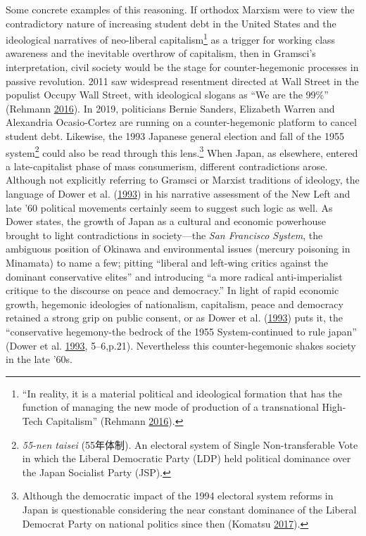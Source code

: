 \documentclass[10pt,british,A4paper,,openany]{memoir}
\begin{document}
Some concrete examples of this reasoning. If orthodox Marxism were to
view the contradictory nature of increasing student debt in the United
States and the ideological narratives of neo-liberal
capitalism\footnote{``In reality, it is a material political and
  ideological formation that has the function of managing the new mode
  of production of a transnational High-Tech Capitalism'' (Rehmann
  \protect\hyperlink{ref-rehmann_bernie_2016}{2016}).} as a trigger for
working class awareness and the inevitable overthrow of capitalism, then
in Gramsci's interpretation, civil society would be the stage for
counter-hegemonic processes in passive revolution. 2011 saw widespread
resentment directed at Wall Street in the populist Occupy Wall Street,
with ideological slogans as ``We are the 99\%'' (Rehmann
\protect\hyperlink{ref-rehmann_bernie_2016}{2016}). In 2019, politicians
Bernie Sanders, Elizabeth Warren and Alexandria Ocasio-Cortez are
running on a counter-hegemonic platform to cancel student debt.
Likewise, the 1993 Japanese general election and fall of the 1955
system\footnote{\emph{55-nen taisei} (55年体制). An electoral system of
  Single Non-transferable Vote in which the Liberal Democratic Party
  (LDP) held political dominance over the Japan Socialist Party (JSP).}
could also be read through this lens.\footnote{Although the democratic
  impact of the 1994 electoral system reforms in Japan is questionable
  considering the near constant dominance of the Liberal Democrat Party
  on national politics since then (Komatsu
  \protect\hyperlink{ref-komatsu_first_2017}{2017}).} When Japan, as
elsewhere, entered a late-capitalist phase of mass consumerism,
different contradictions arose. Although not explicitly referring to
Gramsci or Marxist traditions of ideology, the language of Dower et al.
(\protect\hyperlink{ref-dower_peace_1993}{1993}) in his narrative
assessment of the New Left and late '60 political movements certainly
seem to suggest such logic as well. As Dower states, the growth of Japan
as a cultural and economic powerhouse brought to light contradictions in
society---the \emph{San Francisco System}, the ambiguous position of
Okinawa and environmental issues (mercury poisoning in Minamata) to name
a few; pitting ``liberal and left-wing critics against the dominant
conservative elites'' and introducing ``a more radical anti-imperialist
critique to the discourse on peace and democracy.'' In light of rapid
economic growth, hegemonic ideologies of nationalism, capitalism, peace
and democracy retained a strong grip on public consent, or as Dower et
al. (\protect\hyperlink{ref-dower_peace_1993}{1993}) puts it, the
``conservative hegemony-the bedrock of the 1955 System-continued to rule
japan'' (Dower et al. \protect\hyperlink{ref-dower_peace_1993}{1993},
5--6,p.21). Nevertheless this counter-hegemonic shakes society in the
late '60s.
\end{document}
